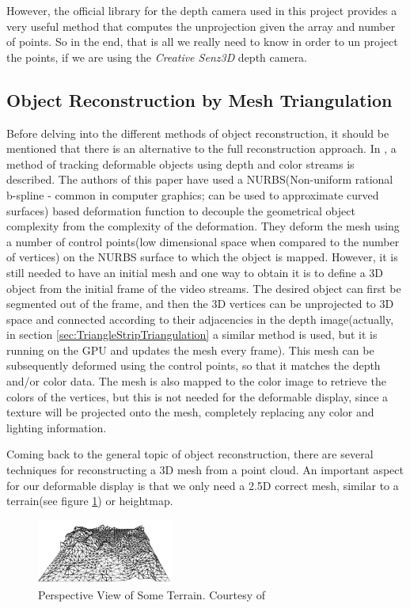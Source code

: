 \documentclass[]{article}
\begin{document}
However, the official library for the depth camera used in this project provides a very useful method that computes the unprojection given the array and number of points. So in the end, that is all we really need to know in order to un project the points, if we are using the \textit{Creative Senz3D} depth camera.
 
\subsection{Object Reconstruction by Mesh Triangulation}

Before delving into the different methods of object reconstruction, it should be mentioned that there is an alternative to the full reconstruction approach. In \cite{Jordt2011}, a method of tracking deformable objects using depth and color streams is described. The authors of this paper have used a NURBS(Non-uniform rational b-spline - common in computer graphics; can be used to approximate curved surfaces) based deformation function to decouple the geometrical object complexity from the complexity of the deformation. They deform the mesh using a number of control points(low dimensional space when compared to the number of vertices) on the NURBS surface to which the object is mapped. However, it is still needed to have an initial mesh and one way to obtain it is to define a 3D object from the initial frame of the video streams. The desired object can first be segmented out of the frame, and then the 3D vertices can be unprojected to 3D space and connected according to their adjacencies in the depth image(actually, in section \ref{sec:TriangleStripTriangulation} a similar method is used, but it is running on the GPU and updates the mesh every frame). This mesh can be subsequently deformed using the control points, so that it matches the depth and/or color data. The mesh is also mapped to the color image to retrieve the colors of the vertices, but this is not needed for the deformable display, since a texture will be projected onto the mesh, completely replacing any color and lighting information.

Coming back to the general topic of object reconstruction, there are several techniques for reconstructing a 3D mesh from a point cloud. An important aspect for our deformable display is that we only need a 2.5D correct mesh, similar to a terrain(see figure \ref{fig:PerspectiveTerrain}) or heightmap. 

\begin{figure}[hbtp]
    \centering
    \includegraphics[width=0.4\textwidth]{figures/PerspectiveTerrain.PNG}
    \caption{Perspective View of Some Terrain. Courtesy of \cite[Chapter~9]{berg08}}
    \label{fig:PerspectiveTerrain}
\end{figure}
\end{document}
